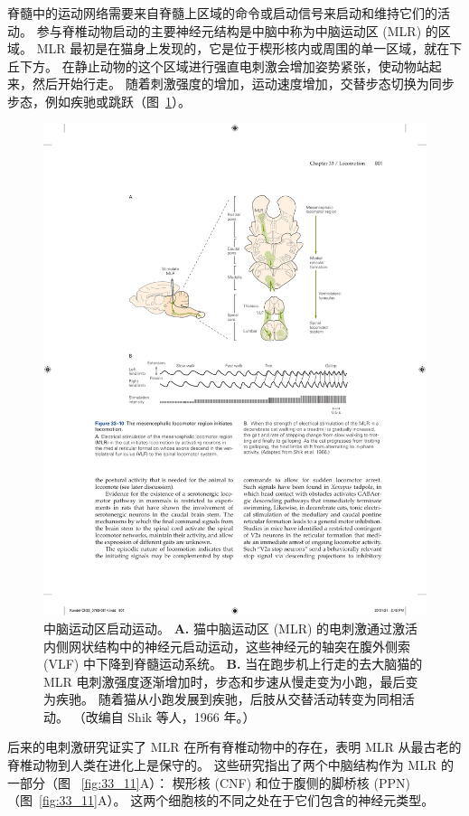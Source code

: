 脊髓中的运动网络需要来自脊髓上区域的命令或启动信号来启动和维持它们的活动。
参与脊椎动物启动的主要神经元结构是中脑中称为中脑运动区 (MLR) 的区域。
MLR 最初是在猫身上发现的，它是位于楔形核内或周围的单一区域，就在下丘下方。
在静止动物的这个区域进行强直电刺激会增加姿势紧张，使动物站起来，然后开始行走。
随着刺激强度的增加，运动速度增加，交替步态切换为同步步态，例如疾驰或跳跃（图~\ref{fig:33_10}）。


\begin{figure}[htbp]
	\centering
	\includegraphics[width=0.7\linewidth]{chap33/fig_33_10}
	\caption{中脑运动区启动运动。
		\textbf{A.} 猫中脑运动区 (MLR) 的电刺激通过激活内侧网状结构中的神经元启动运动，这些神经元的轴突在腹外侧索 (VLF) 中下降到脊髓运动系统。
		\textbf{B.} 当在跑步机上行走的去大脑猫的 MLR 电刺激强度逐渐增加时，步态和步速从慢走变为小跑，最后变为疾驰。
		随着猫从小跑发展到疾驰，后肢从交替活动转变为同相活动。 （改编自 Shik 等人，1966 年。）}
	\label{fig:33_10}
\end{figure}


后来的电刺激研究证实了 MLR 在所有脊椎动物中的存在，表明 MLR 从最古老的脊椎动物到人类在进化上是保守的。
这些研究指出了两个中脑结构作为 MLR 的一部分（图 ~\ref{fig:33_11}A）：
楔形核 (CNF) 和位于腹侧的脚桥核 (PPN)（图~\ref{fig:33_11}A）。
这两个细胞核的不同之处在于它们包含的神经元类型。


